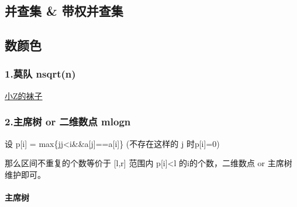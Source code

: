 \documentclass[
]{article}
\begin{document}
\hypertarget{ux5e76ux67e5ux96c6-ux5e26ux6743ux5e76ux67e5ux96c6}{%
\subsection{并查集 \&
带权并查集}\label{ux5e76ux67e5ux96c6-ux5e26ux6743ux5e76ux67e5ux96c6}}

\hypertarget{ux6570ux989cux8272}{%
\subsection{数颜色}\label{ux6570ux989cux8272}}

\hypertarget{ux83abux961f-nsqrtn}{%
\subsubsection{1.莫队 nsqrt(n)}\label{ux83abux961f-nsqrtn}}

\href{https://www.luogu.com.cn/problem/P1494}{小Z的袜子}

\hypertarget{ux4e3bux5e2dux6811-or-ux4e8cux7ef4ux6570ux70b9-mlogn}{%
\subsubsection{2.主席树 or 二维数点
mlogn}\label{ux4e3bux5e2dux6811-or-ux4e8cux7ef4ux6570ux70b9-mlogn}}

设 p{[}i{]} = max\{j\textbar j\textless i\&\&a{[}j{]}==a{[}i{]}\}
(不存在这样的 j 时p{[}i{]}=0)

那么区间不重复的个数等价于 {[}l,r{]} 范围内 p{[}i{]}\textless l
的i的个数，二维数点 or 主席树维护即可。

\hypertarget{ux4e3bux5e2dux6811}{%
\paragraph{主席树}\label{ux4e3bux5e2dux6811}}
\end{document}
